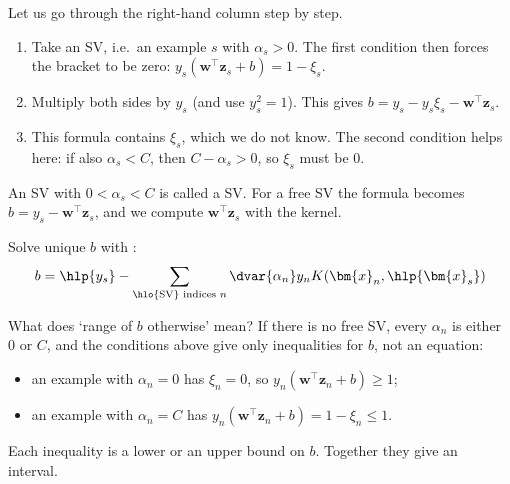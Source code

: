 Let us go through the right-hand column step by step.
\begin{enumerate}
    \item Take an SV, i.e.\ an example \(s\) with \(\alpha_s > 0\). The
        first condition then forces the bracket to be zero: \(y_s
        (\bm{w}^\top \bm{z}_s + b) = 1 - \xi_s\).
    \item Multiply both sides by \(y_s\) (and use \(y_s^2 = 1\)). This
        gives \(b = y_s - y_s \xi_s - \bm{w}^\top \bm{z}_s\).
    \item This formula contains \(\xi_s\), which we do not know. The second
        condition helps here: if also \(\alpha_s < C\), then \(C - \alpha_s
        > 0\), so \(\xi_s\) must be \(0\).
\end{enumerate}
An SV with \(0 < \alpha_s < C\) is called a  SV. For a free SV
the formula becomes \(b = y_s - \bm{w}^\top \bm{z}_s\), and we compute
\(\bm{w}^\top \bm{z}_s\) with the kernel.

\begin{moral}
    Solve unique \(b\) with :
    \[
        b = \hlp{y_s} - \sum_{\hlo{\text{SV}} \text{ indices } n}
        \dvar{\alpha_n} y_n K(\bm{x}_n, \hlp{\bm{x}_s})
    \]
\end{moral}

What does `range of \(b\) otherwise' mean? If there is no free SV, every
\(\alpha_n\) is either \(0\) or \(C\), and the conditions above give only
inequalities for \(b\), not an equation:
\begin{itemize}
    \item an example with \(\alpha_n = 0\) has \(\xi_n = 0\), so \(y_n
        (\bm{w}^\top \bm{z}_n + b) \ge 1\);
    \item an example with \(\alpha_n = C\) has \(y_n (\bm{w}^\top \bm{z}_n +
        b) = 1 - \xi_n \le 1\).
\end{itemize}
Each inequality is a lower or an upper bound on \(b\). Together they give an
interval.

